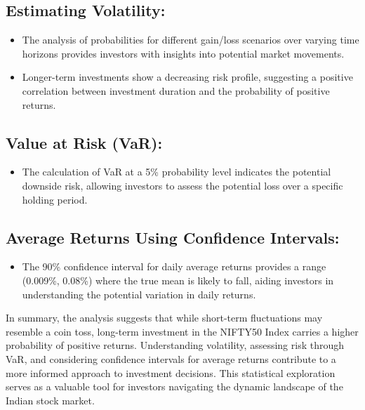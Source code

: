 \documentclass[11pt]{article}
\begin{document}
\subsection*{Estimating Volatility:}

\begin{itemize}
  \item The analysis of probabilities for different gain/loss scenarios over varying time horizons provides investors with insights into potential market movements.
  \item Longer-term investments show a decreasing risk profile, suggesting a positive correlation between investment duration and the probability of positive returns.
\end{itemize}

\subsection*{Value at Risk (VaR):}

\begin{itemize}
  \item The calculation of VaR at a 5\% probability level indicates the potential downside risk, allowing investors to assess the potential loss over a specific holding period.
\end{itemize}

\subsection*{Average Returns Using Confidence Intervals:}

\begin{itemize}
  \item The 90\% confidence interval for daily average returns provides a range (0.009\%, 0.08\%) where the true mean is likely to fall, aiding investors in understanding the potential variation in daily returns.
\end{itemize}

In summary, the analysis suggests that while short-term fluctuations may resemble a coin toss, long-term investment in the NIFTY50 Index carries a higher probability of positive returns. Understanding volatility, assessing risk through VaR, and considering confidence intervals for average returns contribute to a more informed approach to investment decisions. This statistical exploration serves as a valuable tool for investors navigating the dynamic landscape of the Indian stock market.
\end{document}
